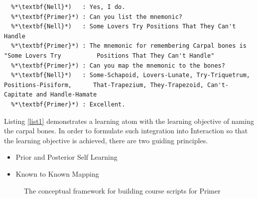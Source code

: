 \documentclass[]{article}
\begin{document}
\begin{lstlisting}[frame=single,caption=Learning Atom with learning objective - To List the carpal bones,label=list2]
  %*\textbf{Primer}*) : Nell, Do you recall the mnemonic for naming the carpal bones?
  %*\textbf{Nell}*)   : Yes, I do.
  %*\textbf{Primer}*) : Can you list the mnemonic?
  %*\textbf{Nell}*)   : Some Lovers Try Positions That They Can't Handle
  %*\textbf{Primer}*) : The mnemonic for remembering Carpal bones is "Some Lovers Try          Positions That They Can't Handle"
  %*\textbf{Primer}*) : Can you map the mnemonic to the bones?
  %*\textbf{Nell}*)   : Some-Schapoid, Lovers-Lunate, Try-Triquetrum, Positions-Pisiform,      That-Trapezium, They-Trapezoid, Can't-Capitate and Handle-Hamate
  %*\textbf{Primer}*) : Excellent.
  \end{lstlisting}


Listing \ref{list1} demonstrates a learning atom with the learning objective of naming the carpal bones.
In order to formulate such integration into Interaction so that the learning objective is achieved, there are two guiding principles.

\begin{itemize}
  
  
  \item Prior and Posterior Self Learning
  \item Known to Known Mapping
  
\end{itemize}

\begin{figure}[]
    \caption{The conceptual framework for building course scripts for Primer }
    \label{fig2}
\end{figure}
\end{document}
